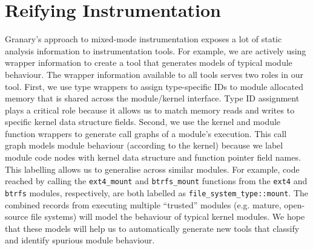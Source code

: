 \documentclass[preprint]{sigplanconf}
\begin{document}
\section{Reifying Instrumentation}\label{sec:reify}

Granary's approach to mixed-mode instrumentation exposes a lot of static analysis information to instrumentation tools. For example, we are actively using wrapper information to create a tool that generates models of typical module behaviour. The wrapper information available to all tools serves two roles in our tool. First, we use type wrappers to assign type-specific IDs to module allocated memory that is shared across the module/kernel interface. Type ID assignment plays a critical role because it allows us to match memory reads and writes to specific kernel data structure fields. Second, we use the kernel and module function wrappers to generate call graphs of a module's execution. This call graph models module behaviour (according to the kernel) because we label module code nodes with kernel data structure and function pointer field names. This labelling allows us to generalise across similar modules. For example, code reached by calling the \texttt{ext4\_mount} and \texttt{btrfs\_mount} functions from the \texttt{ext4} and \texttt{btrfs} modules, respectively, are both labelled as \texttt{file\_system\_type::mount}. The combined records from executing multiple ``trusted'' modules (e.g. mature, open-source file systems) will model the behaviour of typical kernel modules. We hope that these models will help us to automatically generate new tools that classify and identify spurious module behaviour.







\end{document}
